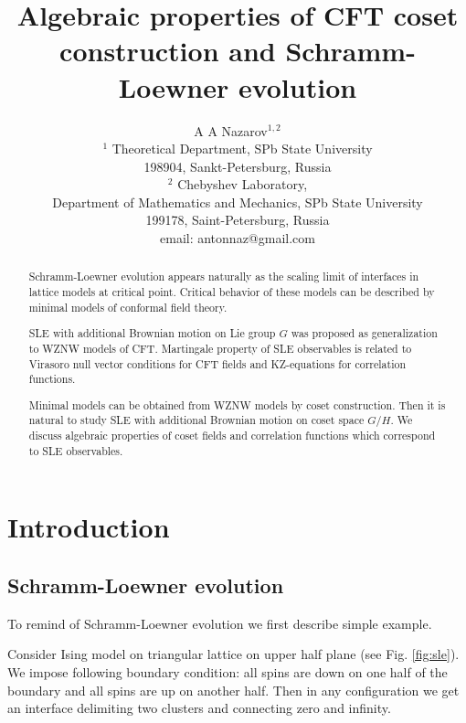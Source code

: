 \documentclass[12pt]{article}
\theoremstyle{definition}
\theoremstyle{definition} \newtheorem{Def}{Definition}
\begin{document}
\title{Algebraic properties of CFT coset construction and Schramm-Loewner evolution}
\author{A A Nazarov$^{1,2}$\\
  {\small $^1$ Theoretical Department, SPb State University}\\
  {\small 198904, Sankt-Petersburg, Russia}\\
  {\small$^{2}$ Chebyshev Laboratory,}\\
  {\small Department of Mathematics and Mechanics, SPb State University}\\
  {\small 199178, Saint-Petersburg, Russia}\\
  {\small email: antonnaz@gmail.com}}

\maketitle

\begin{abstract}
  Schramm-Loewner evolution appears naturally as the scaling limit of interfaces in lattice models at critical point. Critical behavior of these models can be described by minimal models of conformal field theory.

  SLE with additional Brownian motion on Lie group $G$ was proposed as generalization to WZNW models of CFT. Martingale property of SLE observables is related to Virasoro null vector conditions for CFT fields and KZ-equations for correlation functions. 

  Minimal models can be obtained from WZNW models by coset construction. Then it is natural to study SLE with additional Brownian motion on coset space $G/H$. We discuss algebraic properties of coset fields and correlation functions which correspond to SLE observables. 
\end{abstract}

\section{Introduction}
\subsection{Schramm-Loewner evolution}
To remind of Schramm-Loewner evolution we first describe simple example.

Consider Ising model on triangular lattice on upper half plane (see Fig. \ref{fig:sle}). We impose following boundary condition: all spins are down on one half of the boundary and all spins are up on another half. Then in any configuration we get an interface delimiting two clusters and connecting zero and infinity. 
\end{document}
